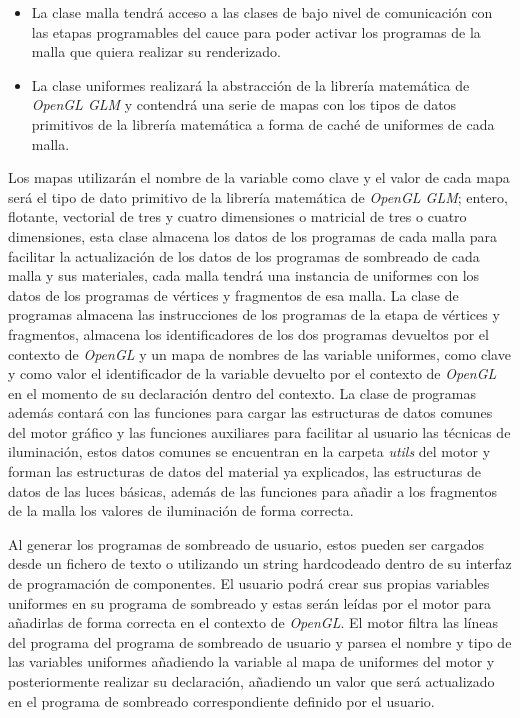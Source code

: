 \documentclass[a4paper]{book}
\begin{document}
\begin{itemize}

\item La clase malla tendrá acceso a las clases de bajo nivel de comunicación con las etapas programables del cauce para poder activar los programas
de la malla que quiera realizar su renderizado.

\item La clase uniformes realizará la abstracción de la librería matemática de \textit{OpenGL GLM} y contendrá una serie de
mapas con los tipos de datos primitivos de la librería matemática a forma de caché de uniformes de cada malla.

\end{itemize}

Los mapas utilizarán el nombre de la variable como clave y el valor de cada mapa será el tipo de dato primitivo de la librería matemática
de \textit{OpenGL GLM}; entero, flotante, vectorial de tres y cuatro dimensiones o matricial de tres o cuatro dimensiones, esta clase almacena
los datos de los programas de cada malla para facilitar la actualización de los datos de los programas de sombreado de cada malla y sus 
materiales, cada malla tendrá una instancia de uniformes con los datos de los programas de vértices y fragmentos de esa malla. La clase de programas
almacena las instrucciones de los programas de la etapa de vértices y fragmentos, almacena los identificadores de los dos programas devueltos por
el contexto de \textit{OpenGL} y un mapa de nombres de las variable uniformes, como clave y como valor el identificador de la variable devuelto por
el contexto de \textit{OpenGL} en el momento de su declaración dentro del contexto. La clase de programas además contará con las funciones para
cargar las estructuras de datos comunes del motor gráfico y las funciones auxiliares para facilitar al usuario las técnicas de iluminación,
estos datos comunes se encuentran en la carpeta \textit{utils} del motor y forman las estructuras de datos del material ya explicados, las
estructuras de datos de las luces básicas, además de las funciones para añadir a los fragmentos de la malla los valores de iluminación de
forma correcta.

Al generar los programas de sombreado de usuario, estos pueden ser cargados desde un fichero de texto o utilizando un string hardcodeado
dentro de su interfaz de programación de componentes. El usuario podrá crear sus propias variables uniformes en
su programa de sombreado y estas serán leídas por el motor para añadirlas de forma correcta en el contexto de \textit{OpenGL}. El motor filtra las
líneas del programa del programa de sombreado de usuario y parsea el nombre y tipo de las variables uniformes añadiendo la variable al mapa de
uniformes del motor y posteriormente realizar su declaración, añadiendo un valor que será actualizado en el programa de sombreado correspondiente
definido por el usuario.
\end{document}
